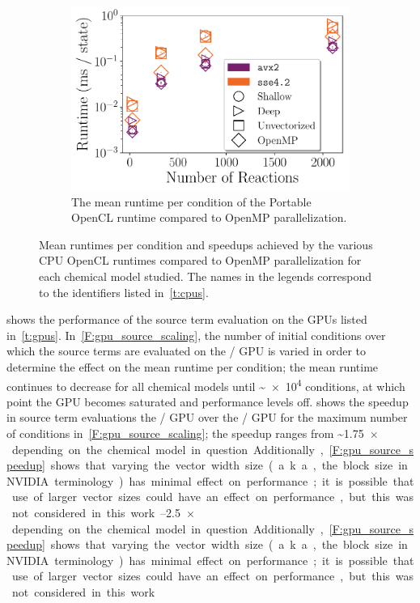 \documentclass[12pt,number,sort&compress,preprint]{elsarticle}
\begin{document}
\begin{figure}[htbp!]
  \\
  \begin{subfigure}[t]{0.48\linewidth}
      \includegraphics[width=\textwidth]{pocl_source_nonorm.pdf}
      \caption{The mean runtime per condition of the Portable OpenCL runtime compared to OpenMP parallelization.}
      \label{F:pocl_source}
  \end{subfigure}
 \caption{Mean runtimes per condition and speedups achieved by the various CPU OpenCL runtimes compared to OpenMP parallelization for each chemical model studied. The names in the legends correspond to the identifiers listed in~\cref{t:cpus}.}
 \label{F:cpu_source}
\end{figure}

 shows the performance of the source term evaluation on the GPUs listed in~\cref{t:gpus}.
In~\cref{F:gpu_source_scaling}, the number of initial conditions over which the source terms are evaluated on the \gpunew/ GPU is varied in order to determine the effect on the mean runtime per condition; the mean runtime continues to decrease for all chemical models until \textasciitilde\num{e4} conditions, at which point the GPU becomes saturated and performance levels off.
 shows the speedup in source term evaluations the \gpunew/ GPU over the \gpuold/ GPU for the maximum number of conditions in~\cref{F:gpu_source_scaling}; the speedup ranges from \textasciitilde\SIrange{1.75}{2.5}{$\times$} depending on the chemical model in question.
Additionally,~\cref{F:gpu_source_speedup} shows that varying the vector width size (a.k.a., the block size in NVIDIA terminology) has minimal effect on performance; it is possible that use of larger vector sizes could have an effect on performance, but this was not considered in this work.
\end{document}
